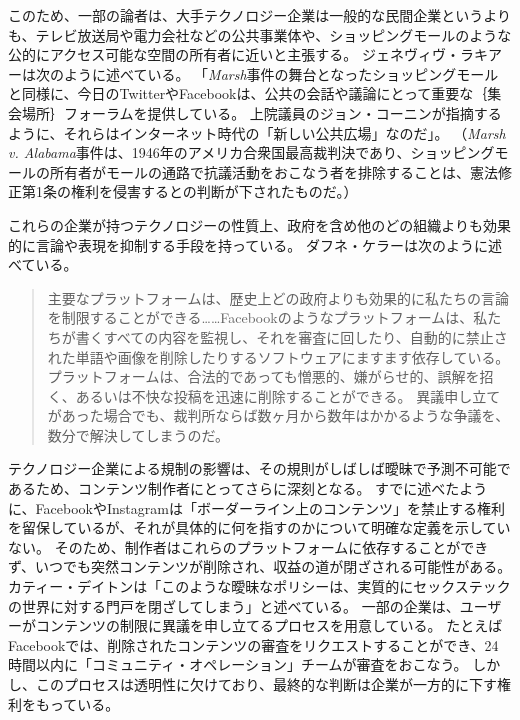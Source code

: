 \documentclass[paper=a4,book,openany]{jlreq}
\newcommand{\ig}[1]{}           %
\begin{document}
このため、一部の論者は、大手テクノロジー企業は一般的な民間企業というよりも、テレビ放送局や電力会社などの公共事業体や、ショッピングモールのような公的にアクセス可能な空間の所有者に近いと主張する\citep{swire17:_shoul_leadin_onlin_tech_compan}。
ジェネヴィヴ・ラキアー\ig{Genevieve Lakier}は次のように述べている。
「\emph{Marsh}事件の舞台となったショッピングモールと同様に、今日のTwitterやFacebookは、公共の会話や議論にとって重要な｛集会場所｝{フォーラム}を提供している。
上院議員のジョン・コーニン\ig{John Cornyn}が指摘するように、それらはインターネット時代の「新しい公共広場」なのだ」\citep{lakier21:_great_free_speec_rever}。
（\emph{Marsh v. Alabama}事件は、1946年のアメリカ合衆国最高裁判決であり、ショッピングモールの所有者がモールの通路で抗議活動をおこなう者を排除することは、憲法修正第1条の権利を侵害するとの判断が下されたものだ。）

これらの企業が持つテクノロジーの性質上、政府を含め他のどの組織よりも効果的に言論や表現を抑制する手段を持っている。
ダフネ・ケラーは次のように述べている。

\begin{quote}
主要なプラットフォームは、歴史上どの政府よりも効果的に私たちの言論を制限することができる……Facebookのようなプラットフォームは、私たちが書くすべての内容を監視し、それを審査に回したり、自動的に禁止された単語や画像を削除したりするソフトウェアにますます依存している。
プラットフォームは、合法的であっても憎悪的、嫌がらせ的、誤解を招く、あるいは不快な投稿を迅速に削除することができる。
異議申し立てがあった場合でも、裁判所ならば数ヶ月から数年はかかるような争議を、数分で解決してしまうのだ。
\citep{keller19:_faceb_restr_speec_popul_deman}
\end{quote}

テクノロジー企業による規制の影響は、その規則がしばしば曖昧で予測不可能であるため、コンテンツ制作者にとってさらに深刻となる。
すでに述べたように、FacebookやInstagramは「ボーダーライン上のコンテンツ」を禁止する権利を留保しているが、それが具体的に何を指すのかについて明確な定義を示していない。
そのため、制作者はこれらのプラットフォームに依存することができず、いつでも突然コンテンツが削除され、収益の道が閉ざされる可能性がある。
カティー・デイトンは「このような曖昧なポリシーは、実質的にセックステックの世界に対する門戸を閉ざしてしまう」と述べている\citep{deighton20:_why_sex_start_face_uphil_paymen_battl}。
一部の企業は、ユーザーがコンテンツの制限に異議を申し立てるプロセスを用意している。
たとえばFacebookでは、削除されたコンテンツの審査をリクエストすることができ、24時間以内に「コミュニティ・オペレーション」チームが審査をおこなう。
しかし、このプロセスは透明性に欠けており、最終的な判断は企業が一方的に下す権利をもっている。
\end{document}
